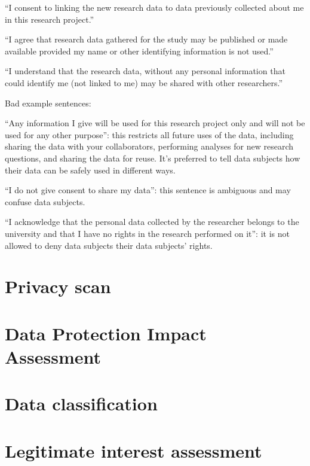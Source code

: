 \documentclass[
]{book}
\begin{document}
``I consent to linking the new research data to data previously collected
about me in this research project.''

``I agree that research data gathered for the study may be published or
made available provided my name or other identifying information is not used.''

``I understand that the research data, without any personal information
that could identify me (not linked to me) may be shared with other researchers.''

Bad example sentences:

``Any information I give will be used for this research project only and
will not be used for any other purpose'': this restricts all future uses of
the data, including sharing the data with your collaborators, performing
analyses for new research questions, and sharing the data for reuse. It's
preferred to tell data subjects how their data can be safely used in
different ways.

``I do not give consent to share my data'': this sentence is ambiguous and
may confuse data subjects.

``I acknowledge that the personal data collected by the researcher belongs
to the university and that I have no rights in the research performed on it'':
it is not allowed to deny data subjects their data subjects' rights.

\hypertarget{privacy-scan}{%
\section{Privacy scan}\label{privacy-scan}}

\hypertarget{dpia}{%
\section{Data Protection Impact Assessment}\label{dpia}}

\hypertarget{data-classification}{%
\section{Data classification}\label{data-classification}}

\hypertarget{legitimate-interest-assessment}{%
\section{Legitimate interest assessment}\label{legitimate-interest-assessment}}
\end{document}
